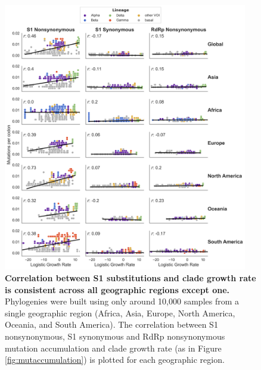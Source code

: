 \documentclass[11pt,oneside,letterpaper]{article}
\begin{document}
\begin{figure}[h!]
\centerline{\includegraphics[width=0.95\textwidth]{disc_supp_regions.png}}
\caption{\textbf{Correlation between S1 substitutions and clade growth rate is consistent across all geographic regions except one.}
Phylogenies were built using only around 10,000 samples from a single geographic region (Africa, Asia, Europe, North America, Oceania, and South America). The correlation between S1 nonsynonymous, S1 synonymous and RdRp nonsynonymous mutation accumulation and clade growth rate (as in Figure \ref{fig:mutaccumulation}) is plotted for each geographic region.
}
\label{fig:regionalcorrelation}
\end{figure}
\end{document}
